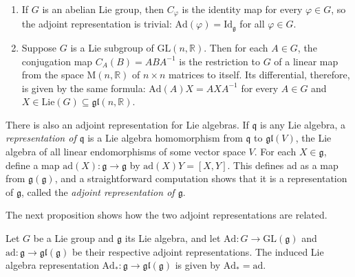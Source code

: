 \begin{example}
\label{ex:adjoint-representations-lie-groups}

\begin{enumerate}
\item[(a)] If $G$ is an abelian Lie group, then $C_\varphi$ is the identity map for every $\varphi \in G$, so the adjoint representation is trivial: $\text{Ad}(\varphi) = \text{Id}_\mathfrak{g}$ for all $\varphi \in G$.

\item[(b)] Suppose $G$ is a Lie subgroup of $\text{GL}(n,\mathbb{R})$. Then for each $A \in G$, the conjugation map $C_A(B) = ABA^{-1}$ is the restriction to $G$ of a linear map from the space $\text{M}(n,\mathbb{R})$ of $n \times n$ matrices to itself. Its differential, therefore, is given by the same formula: $\text{Ad}(A)X = AXA^{-1}$ for every $A \in G$ and $X \in \text{Lie}(G) \subseteq \mathfrak{gl}(n,\mathbb{R})$.
\end{enumerate}

\end{example}

There is also an adjoint representation for Lie algebras. If $\mathfrak{q}$ is any Lie algebra, a \emph{representation of $\mathfrak{q}$} is a Lie algebra homomorphism from $\mathfrak{q}$ to $\mathfrak{gl}(V)$, the Lie algebra of all linear endomorphisms of some vector space $V$. For each $X \in \mathfrak{g}$, define a map $\text{ad}(X): \mathfrak{g} \to \mathfrak{g}$ by $\text{ad}(X)Y = [X, Y]$. This defines ad as a map from $\mathfrak{g}(\mathfrak{g})$, and a straightforward computation shows that it is a representation of $\mathfrak{g}$, called the \emph{adjoint representation of $\mathfrak{g}$}.

The next proposition shows how the two adjoint representations are related.

\begin{proposition}
\label{prop:adjoint-induced-from-group}

Let $G$ be a Lie group and $\mathfrak{g}$ its Lie algebra, and let $\text{Ad}: G \to \text{GL}(\mathfrak{g})$ and $\text{ad}: \mathfrak{g} \to \mathfrak{gl}(\mathfrak{g})$ be their respective adjoint representations. The induced Lie algebra representation $\text{Ad}_*: \mathfrak{g} \to \mathfrak{gl}(\mathfrak{g})$ is given by $\text{Ad}_* = \text{ad}$.

\end{proposition}

